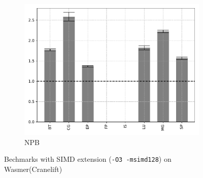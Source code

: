 \begin{figure}
\begin{subfigure}[t]{.45\textwidth}
        \includegraphics[width=\textwidth]
        {Images/6.1.RQ1/npb-wasmer-cranelift-simd.pdf}
        \caption{NPB}
    \end{subfigure}
    \caption{Bechmarks with SIMD extension (\texttt{-O3 -msimd128}) on Wasmer(Cranelift)}
    \label{fig:rq1-wasmer-cranelift-simd}
\end{figure}

